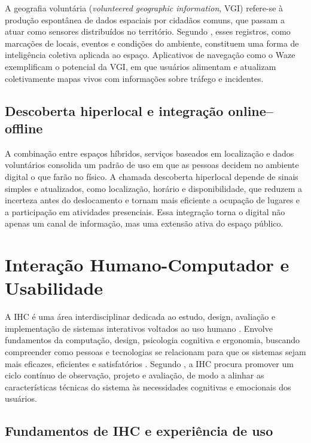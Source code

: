         A geografia voluntária (\textit{volunteered geographic information}, VGI) refere-se à produção espontânea de dados espaciais por cidadãos comuns, que passam a atuar como sensores distribuídos no território. Segundo , esses registros, como marcações de locais, eventos e condições do ambiente, constituem uma forma de inteligência coletiva aplicada ao espaço. Aplicativos de navegação como o Waze exemplificam o potencial da VGI, em que usuários alimentam e atualizam coletivamente mapas vivos com informações sobre tráfego e incidentes.

        \subsection{Descoberta hiperlocal e integração online--offline}

        A combinação entre espaços híbridos, serviços baseados em localização e dados voluntários consolida um padrão de uso em que as pessoas decidem no ambiente digital o que farão no físico. A chamada descoberta hiperlocal depende de sinais simples e atualizados, como localização, horário e disponibilidade, que reduzem a incerteza antes do deslocamento e tornam mais eficiente a ocupação de lugares e a participação em atividades presenciais. Essa integração torna o digital não apenas um canal de informação, mas uma extensão ativa do espaço público.

    \section{Interação Humano-Computador e Usabilidade}

        A IHC é uma área interdisciplinar dedicada ao estudo, design, avaliação e implementação de sistemas interativos voltados ao uso humano \cite{barbosa2010ihc}. Envolve fundamentos da computação, design, psicologia cognitiva e ergonomia, buscando compreender como pessoas e tecnologias se relacionam para que os sistemas sejam mais eficazes, eficientes e satisfatórios \cite{preece2019interaction}. Segundo , a IHC procura promover um ciclo contínuo de observação, projeto e avaliação, de modo a alinhar as características técnicas do sistema às necessidades cognitivas e emocionais dos usuários.

        \subsection{Fundamentos de IHC e experiência de uso}

